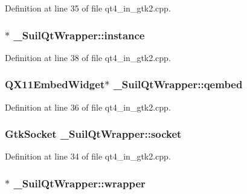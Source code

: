 Definition at line 35 of file qt4\+\_\+in\+\_\+gtk2.\+cpp.

\subsubsection[{\texorpdfstring{instance}{instance}}]{$\ast$ \+\_\+\+Suil\+Qt\+Wrapper\+::instance}\hypertarget{struct___suil_qt_wrapper_ae5e5a3515f9bbcb499e230edbe6a8380}{}\label{struct___suil_qt_wrapper_ae5e5a3515f9bbcb499e230edbe6a8380}


Definition at line 38 of file qt4\+\_\+in\+\_\+gtk2.\+cpp.

\subsubsection[{\texorpdfstring{qembed}{qembed}}]{\setlength{\rightskip}{0pt plus 5cm}Q\+X11\+Embed\+Widget$\ast$ \+\_\+\+Suil\+Qt\+Wrapper\+::qembed}\hypertarget{struct___suil_qt_wrapper_ad51ddb6c6576a239f2d1b7a98c61c8b4}{}\label{struct___suil_qt_wrapper_ad51ddb6c6576a239f2d1b7a98c61c8b4}


Definition at line 36 of file qt4\+\_\+in\+\_\+gtk2.\+cpp.

\subsubsection[{\texorpdfstring{socket}{socket}}]{\setlength{\rightskip}{0pt plus 5cm}Gtk\+Socket \+\_\+\+Suil\+Qt\+Wrapper\+::socket}\hypertarget{struct___suil_qt_wrapper_a0448246983d048fccd071dece1396bcf}{}\label{struct___suil_qt_wrapper_a0448246983d048fccd071dece1396bcf}


Definition at line 34 of file qt4\+\_\+in\+\_\+gtk2.\+cpp.

\subsubsection[{\texorpdfstring{wrapper}{wrapper}}]{$\ast$ \+\_\+\+Suil\+Qt\+Wrapper\+::wrapper}\hypertarget{struct___suil_qt_wrapper_a57e37e01ccdfe50eedd9ae37c9e8338c}{}\label{struct___suil_qt_wrapper_a57e37e01ccdfe50eedd9ae37c9e8338c}



